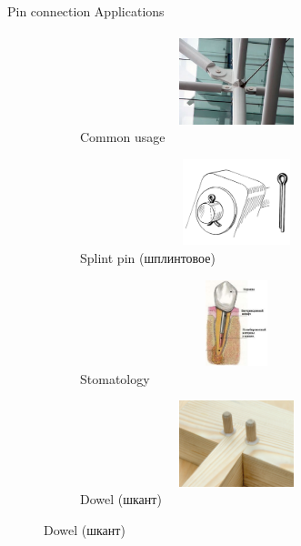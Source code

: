 \documentclass[aspectratio=169]{beamer}
\begin{document}
\begin{frame}[t]{Pin connection Applications}
    \framesubtitle{}
    \vspace{-0.6cm}
    \begin{figure}[H]
        \begin{subfigure}{0.49\textwidth}
            \centering\includegraphics[height=2.5cm,width=1\textwidth,keepaspectratio]{pin_use_1.png}
            \caption*{Common usage}
            \label{fig:pin_use_1.png}
        \end{subfigure}
        \begin{subfigure}{0.49\textwidth}
            \centering\includegraphics[height=2.5cm,width=1\textwidth,keepaspectratio]{pin_use_2.png}
            \caption*{Splint pin (шплинтовое)}
            \label{fig:pin_use_2.png}
        \end{subfigure}

        \begin{subfigure}{0.49\textwidth}
            \centering\includegraphics[height=2.5cm,width=1\textwidth,keepaspectratio]{pin_use_3.jpg}
            \caption*{Stomatology}
            \label{fig:pin_use_3.jpg}
        \end{subfigure}
        \begin{subfigure}{0.49\textwidth}
            \centering\includegraphics[height=2.5cm,width=1\textwidth,keepaspectratio]{dowel.jpeg}
            \caption*{Dowel (шкант)}
            \label{fig:dowel.jpeg}
        \end{subfigure}
    \end{figure}
\end{frame}
\end{document}
